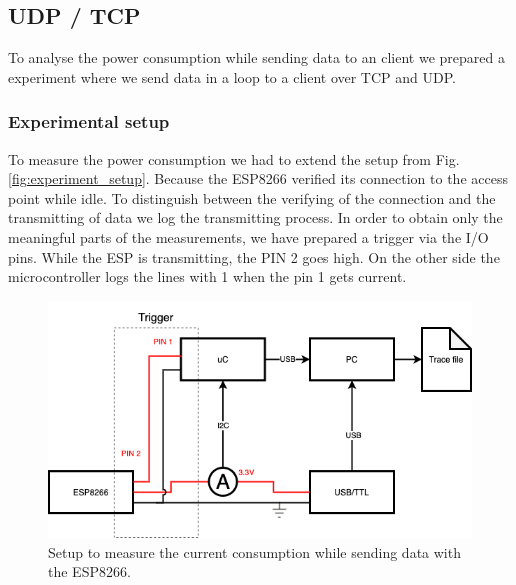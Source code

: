 \subsection{UDP / TCP}
To analyse the power consumption while sending data to an client we prepared a 
experiment where we send data in a loop to a client over TCP and UDP.\\

\subsubsection{Experimental setup}
To measure the power consumption we had to extend the setup from Fig.\ref{fig:experiment_setup}.
Because the ESP8266 verified its connection to the access point while idle.
To distinguish between the verifying of the connection and the transmitting of
data we log the transmitting process.
In order to obtain only the meaningful parts of the measurements,
we have prepared a trigger via the I/O pins. While the ESP is transmitting,
the PIN 2 goes high.
On the other side the microcontroller logs the lines with 1 when the pin 1 gets current.
\newline
\begin{figure}[h]
\centering
\includegraphics[width = 0.90 \linewidth]{fig/udp_tcp/experimental_setup_udp_tcp.png}
\caption{Setup to measure the current consumption while sending data with the ESP8266.}
\label{fig:experiment_udp_tcp}
\end{figure}
